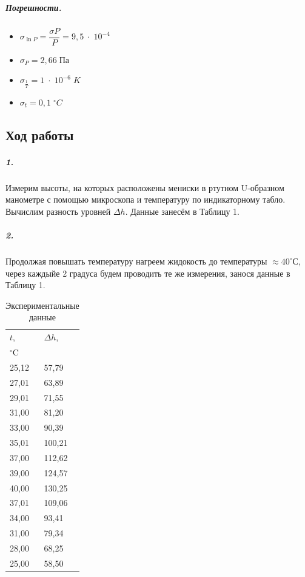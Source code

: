 \documentclass[a4paper, 12pt]{article}
\begin{document}
\newpage

\subparagraph*{Погрешности.}

\begin{itemize}
	\item $ \sigma_{\ln{P}} = \dfrac{\sigma P}{P} = 9,5 \; \cdot \; 10^{-4} \;$
	\item $ \sigma_{P} = 2,66 \; \text{Па}$
	\item $ \sigma_{\frac{1}{T}} = 1 \; \cdot \; 10^{-6} \; K  $
	\item $ \sigma_{t} = 0,1 \; ^{\circ}C $ 
\end{itemize}

\begin{center}
	\section*{Ход работы}
\end{center}

\subparagraph*{1.} Измерим высоты, на которых расположены мениски в ртутном U-образном манометре с помощью микроскопа и температуру по  индикаторному табло. Вычислим разность уровней $\Delta h$. Данные занесём в Таблицу 1. 

\subparagraph*{2.} Продолжая повышать температуру нагреем жидокость до температуры $\approx 40^{\circ}$С,
через каждыйе 2 градуса будем проводить те же измерения, занося данные в Таблицу 1. 

\begin{table}[h!] 
	\caption{Экспериментальные данные}
	\begin{center}
	\begin{tabular}{|*{2}{l|}}
		\hline 
		$t$,&$\Delta h$,      \\ 
		$^{\circ}$C&\text{мм} \\ \hline

		25,12 & 57,79   	  \\ \hline 
		27,01 & 63,89   	  \\ \hline 
		29,01 & 71,55   	  \\ \hline 
		31,00 & 81,20   	  \\ \hline 
		33,00 & 90,39   	  \\ \hline 
		35,01 & 100,21  	  \\ \hline 
		37,00 & 112,62  	  \\ \hline 
		39,00 & 124,57  	  \\ \hline 
		40,00 & 130,25  	  \\ \hline \hline
		37,01 & 109,06  	  \\ \hline 
		34,00 & 93,41   	  \\ \hline 
		31,00 & 79,34   	  \\ \hline 
		28,00 & 68,25   	  \\ \hline 
		25,00 & 58,50   	  \\ \hline 

	\end{tabular}
	\end{center}
\end{table}
\end{document}
